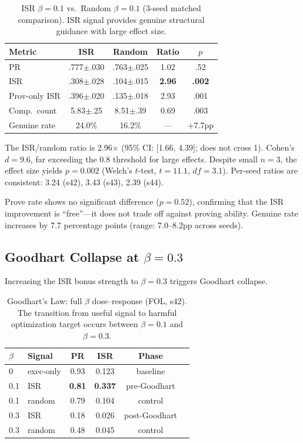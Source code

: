 \documentclass[11pt,twocolumn]{article}
\newcommand{\isr}{\textsc{ISR}}
\newcommand{\pr}{\textsc{PR}}
\begin{document}
\begin{table}[h]
\centering
\caption{ISR $\beta{=}0.1$ vs.\ Random $\beta{=}0.1$ (3-seed matched comparison). ISR signal provides genuine structural guidance with large effect size.}
\label{tab:stat}
\small
\begin{tabular}{@{}lcccc@{}}
\toprule
Metric & ISR & Random & Ratio & $p$ \\
\midrule
\pr{} & .777$\pm$.030 & .763$\pm$.025 & 1.02 & .52 \\
\isr{} & .308$\pm$.028 & .104$\pm$.015 & \textbf{2.96} & \textbf{.002} \\
Prov-only \isr{} & .396$\pm$.020 & .135$\pm$.018 & 2.93 & .001 \\
Comp.\ count & 5.83$\pm$.25 & 8.51$\pm$.39 & 0.69 & .003 \\
Genuine rate & 24.0\% & 16.2\% & --- & +7.7pp \\
\bottomrule
\end{tabular}
\end{table}

The ISR/random ratio is 2.96$\times$ (95\% CI: [1.66, 4.39]; does not cross 1).
Cohen's $d = 9.6$, far exceeding the 0.8 threshold for large effects.
Despite small $n{=}3$, the effect size yields $p{=}0.002$ (Welch's $t$-test, $t{=}11.1$, $df{=}3.1$).
Per-seed ratios are consistent: 3.24 (s42), 3.43 (s43), 2.39 (s44).

Prove rate shows no significant difference ($p{=}0.52$), confirming that the \isr{} improvement is ``free''---it does not trade off against proving ability.
Genuine rate increases by 7.7 percentage points (range: 7.0--8.2pp across seeds).

\subsection{Goodhart Collapse at $\beta{=}0.3$}
\label{sec:goodhart}

Increasing the ISR bonus strength to $\beta{=}0.3$ triggers Goodhart collapse.

\begin{table}[h]
\centering
\caption{Goodhart's Law: full $\beta$ dose--response (FOL, s42). The transition from useful signal to harmful optimization target occurs between $\beta{=}0.1$ and $\beta{=}0.3$.}
\label{tab:goodhart}
\small
\begin{tabular}{@{}llcccc@{}}
\toprule
$\beta$ & Signal & \pr{} & \isr{} & Phase \\
\midrule
0 & exec-only & 0.93 & 0.123 & baseline \\
0.1 & ISR & \textbf{0.81} & \textbf{0.337} & pre-Goodhart \\
0.1 & random & 0.79 & 0.104 & control \\
0.3 & ISR & 0.18 & 0.026 & post-Goodhart \\
0.3 & random & 0.48 & 0.045 & control \\
\bottomrule
\end{tabular}
\end{table}
\end{document}
